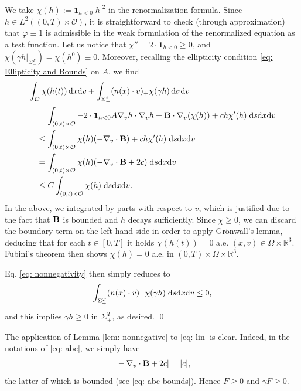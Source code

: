 \documentclass[10pt, reqno]{amsart}
\theoremstyle{plain}
\theoremstyle{definition}
\theoremstyle{remark}
\renewenvironment{proof}[1][\proofname]{\noindent{\scshape #1.\quad}}{\qed}
\numberwithin{equation}{section}
\newcommand{\bfB}{{\bf B}}
\newcommand{\calO}{\mathcal O}
\newcommand{\R}{\mathbb{R}}
\newcommand{\dx}{\textnormal{d}x}
\newcommand{\dv}{\textnormal{d}v}
\newcommand{\ds}{\textnormal{d}s}
\newcommand{\tnd}{\textnormal{d}}
\newcommand{\lt}{\left}
\newcommand{\rt}{\right}
\begin{document}
\begin{proof}
    We take $\chi(h) := \mathbf{1}_{h<0} |h|^2$ in the renormalization formula. Since $h\in L^2((0,T)\times \calO)$, it is straightforward to check (through approximation) that $\varphi\equiv 1$ is admissible in the weak formulation of the renormalized equation as a test function. Let us notice that $\chi'' = 2 \cdot \mathbf{1}_{h<0} \ge 0$, and $\chi\lt(\gamma h|_{\Sigma_-^T} \rt) = \chi(h^0) \equiv 0$. Moreover, recalling the ellipticity condition \eqref{eq: Ellipticity and Bounds} on $A$, we find
    \begin{equation} \label{eq: nonnegativity}
    \begin{split}
        &\int_{\calO} \chi(h(t)) \,\dx\dv + \int_{\Sigma_+^t} (n(x)\cdot v)_+ \chi(\gamma h) \,\tnd\sigma\dv \\
        &\quad= \int_{(0,t)\times \calO} - 2 \cdot \mathbf{1}_{h<0} A\nabla_v h \cdot \nabla_v h + \bfB\cdot \nabla_v (\chi(h)) + c h \chi'(h)  \; \ds\dx\dv \\
        &\quad\le \int_{(0,t)\times \calO} \chi(h) (-\nabla_v\cdot \bfB) + c h \chi'(h) \; \ds\dx\dv \\
        &\quad= \int_{(0,t)\times\calO} \chi(h) (-\nabla_v \cdot \bfB + 2c) \; \ds\dx\dv \\
        &\quad\le C \int_{(0,t)\times \calO} \chi(h) \; \ds\dx\dv.
    \end{split}
    \end{equation}
    In the above, we integrated by parts with respect to $v$, which is justified due to the fact that $\bfB$ is bounded and $h$ decays sufficiently. Since $\chi\ge 0$, we can discard the boundary term on the left-hand side in order to apply Gr\"onwall's lemma, deducing that for each $t\in [0,T]$ it holds $\chi(h(t)) = 0$ a.e. $(x,v)\in\Omega\times\R^3$. Fubini's theorem then shows $\chi(h) = 0$ a.e. in $(0,T)\times\Omega\times\R^3$.
    
    Eq. \eqref{eq: nonnegativity} then simply reduces to
    \begin{align*}
        \int_{\Sigma_+^T} (n(x)\cdot v)_+ \chi(\gamma h) \;\ds\dx\dv \le 0,
    \end{align*}
    and this implies $\gamma h \ge 0$ in $\Sigma_+^T$, as desired.
\end{proof}

The application of Lemma \ref{lem: nonnegative} to \eqref{eq: lin} is clear. Indeed, in the notations of \eqref{eq: abc}, we simply have
\begin{align*}
    |-\nabla_v\cdot \bfB + 2c| = |c|,
\end{align*}
the latter of which is bounded (see \eqref{eq: abc bounds}). Hence $F\ge 0$ and $\gamma F \ge 0$.
\end{document}
